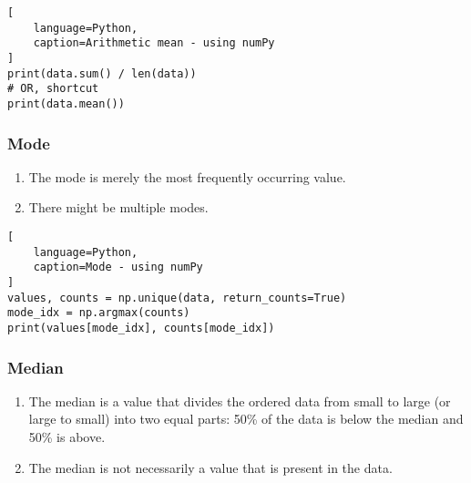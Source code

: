 \begin{lstlisting}[
    language=Python, 
    caption=Arithmetic mean - using numPy
]
print(data.sum() / len(data))
# OR, shortcut
print(data.mean())
\end{lstlisting}



\subsubsection{Mode \cite{statistics/book/Statistics-for-Data-Scientists/Maurits-Kaptein}} \label{Data/Describing Data/Central Tendency/Mode}

\begin{enumerate}
    \item The mode is merely the most frequently occurring value. \hfill \cite{statistics/book/Statistics-for-Data-Scientists/Maurits-Kaptein}

    \item There might be multiple modes. \hfill \cite{statistics/book/Statistics-for-Data-Scientists/Maurits-Kaptein}
    
\end{enumerate}

\begin{lstlisting}[
    language=Python, 
    caption=Mode - using numPy
]
values, counts = np.unique(data, return_counts=True)
mode_idx = np.argmax(counts)
print(values[mode_idx], counts[mode_idx])
\end{lstlisting}



\subsubsection{Median \cite{statistics/book/Statistics-for-Data-Scientists/Maurits-Kaptein}} \label{Data/Describing Data/Central Tendency/Median}

\begin{enumerate}
    \item The median is a value that divides the ordered data from small to large (or large to small) into two equal parts: 50\% of the data is below the median and 50\% is above.  \hfill \cite{statistics/book/Statistics-for-Data-Scientists/Maurits-Kaptein}

    \item The median is not necessarily a value that is present in the data. \hfill \cite{statistics/book/Statistics-for-Data-Scientists/Maurits-Kaptein}
\end{enumerate}


